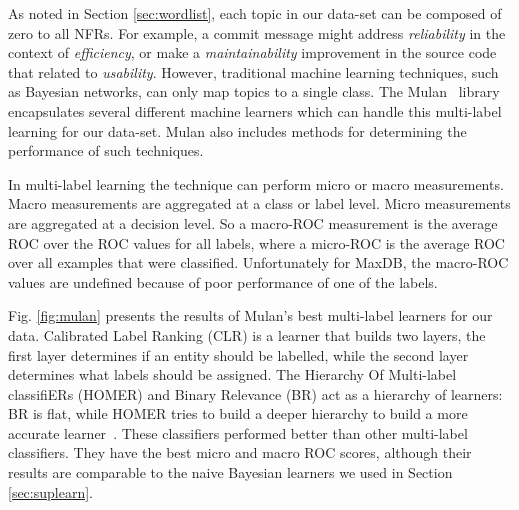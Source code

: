 \documentclass[]{sig-alternate}
\begin{document}
As noted in Section \ref{sec:wordlist}, each topic in our data-set can be composed of zero to all NFRs. For example, a commit message might address \textit{reliability} in the context of \textit{efficiency}, or make a \textit{maintainability} improvement in the source code that related to \textit{usability}. However, traditional machine learning techniques, such as Bayesian networks, can only map topics to a single class. The Mulan~\cite{mulan} library encapsulates several different machine learners which can handle this multi-label learning for our data-set. Mulan also includes methods for determining the performance of such techniques.

In multi-label learning the technique can perform micro or macro measurements. Macro measurements are aggregated at a class or label level. Micro measurements are aggregated at a decision level. So a macro-ROC measurement is the average ROC over the ROC values for all labels, where a micro-ROC is the average ROC over all examples that were classified. Unfortunately for MaxDB, the macro-ROC values are undefined because of poor performance of one of the labels.

Fig. \ref{fig:mulan} presents the results of Mulan's best multi-label
learners for our data. Calibrated Label Ranking (CLR) is a learner
that builds two layers, the first layer determines if an entity should
be labelled, while the second layer determines what labels should be assigned.
The Hierarchy Of Multi-label classifiERs (HOMER) and Binary Relevance (BR) act as a hierarchy of learners: BR is flat, while HOMER tries to build a deeper hierarchy to build a more accurate learner~\cite{mulan}. These classifiers performed better than other multi-label classifiers. They have the best micro and macro ROC scores, although their results are comparable to the naive Bayesian learners we used in Section \ref{sec:suplearn}.
\end{document}
